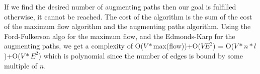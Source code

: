 If we find the desired number of augmenting paths then our goal is fulfilled otherwise, it cannot be reached. The cost of the algorithm is the sum of the cost of the maximum flow algorithm and the augmenting paths algorithm. Using the Ford-Fulkerson algo for the maximum flow, and the Edmonds-Karp for the augmenting paths, we get a complexity of O($V*$max(flow))+O($VE^2$) = O($V*n*l$)+O($V*E^2$) which is polynomial since the number of edges is bound by some multiple of $n$.
